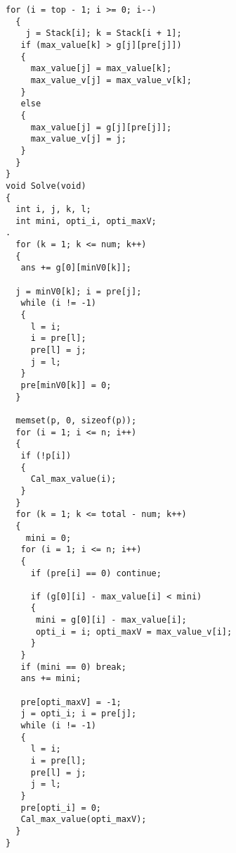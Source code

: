\begin{lstlisting}[language={}]
  for (i = top - 1; i >= 0; i--)
  {
    j = Stack[i]; k = Stack[i + 1];
   if (max_value[k] > g[j][pre[j]])
   {
     max_value[j] = max_value[k];
     max_value_v[j] = max_value_v[k];
   }
   else
   {
     max_value[j] = g[j][pre[j]];
     max_value_v[j] = j;
   }
  }
}
void Solve(void)
{
  int i, j, k, l;
  int mini, opti_i, opti_maxV; 
.
  for (k = 1; k <= num; k++)
  {
   ans += g[0][minV0[k]];

  j = minV0[k]; i = pre[j]; 
   while (i != -1)
   {
     l = i;
     i = pre[l];
     pre[l] = j;
     j = l;
   }
   pre[minV0[k]] = 0;
  }
  
  memset(p, 0, sizeof(p));
  for (i = 1; i <= n; i++)
  {
   if (!p[i])
   {
     Cal_max_value(i);
   }
  }
  for (k = 1; k <= total - num; k++)
  {
    mini = 0; 
   for (i = 1; i <= n; i++)
   {
     if (pre[i] == 0) continue;

     if (g[0][i] - max_value[i] < mini)
     {
      mini = g[0][i] - max_value[i];
      opti_i = i; opti_maxV = max_value_v[i];
     }
   }
   if (mini == 0) break; 
   ans += mini;
    
   pre[opti_maxV] = -1;
   j = opti_i; i = pre[j]; 
   while (i != -1)
   {
     l = i;
     i = pre[l];
     pre[l] = j;
     j = l;
   }
   pre[opti_i] = 0;
   Cal_max_value(opti_maxV);
  }
}
\end{lstlisting}
